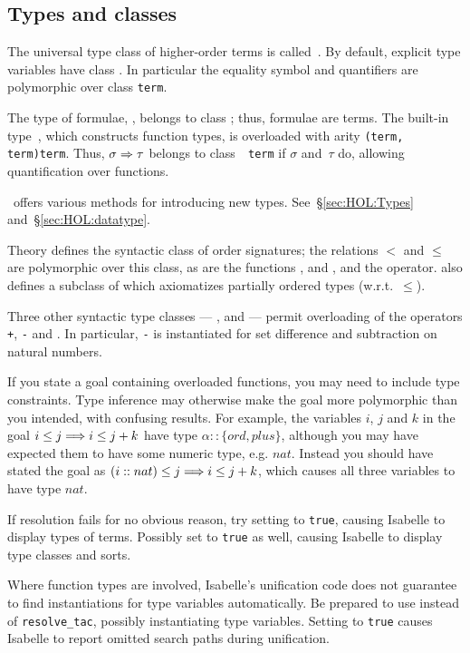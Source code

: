 \subsection{Types and classes}
The universal type class of higher-order terms is called~.
By default, explicit type variables have class .  In
particular the equality symbol and quantifiers are polymorphic over
class \texttt{term}.

The type of formulae, , belongs to class ; thus,
formulae are terms.  The built-in type~, which constructs
function types, is overloaded with arity {\tt(term,\thinspace
  term)\thinspace term}.  Thus, $\sigma\Rightarrow\tau$ belongs to class~{\tt
  term} if $\sigma$ and~$\tau$ do, allowing quantification over
functions.

\HOL\ offers various methods for introducing new types.
See~\S\ref{sec:HOL:Types} and~\S\ref{sec:HOL:datatype}.

Theory  defines the syntactic class  of order
signatures; the relations $<$ and $\leq$ are polymorphic over this
class, as are the functions ,  and , and
the  operator.  also defines a subclass
 of  which axiomatizes partially ordered types
(w.r.t.\ $\le$).

Three other syntactic type classes --- ,  and
 --- permit overloading of the operators {\tt+}, {\tt-} and {\tt*}. In
particular, {\tt-} is instantiated for set difference and subtraction
on natural numbers.

If you state a goal containing overloaded functions, you may need to include
type constraints.  Type inference may otherwise make the goal more
polymorphic than you intended, with confusing results.  For example, the
variables $i$, $j$ and $k$ in the goal $i \le j \Longrightarrow i \le j+k$ have type
$\alpha::\{ord,plus\}$, although you may have expected them to have some
numeric type, e.g. $nat$.  Instead you should have stated the goal as
$(i::nat) \le j \Longrightarrow i \le j+k$, which causes all three variables to have
type $nat$.

\begin{warn}
  If resolution fails for no obvious reason, try setting
   to \texttt{true}, causing Isabelle to display
  types of terms.  Possibly set  to \texttt{true} as
  well, causing Isabelle to display type classes and sorts.

  Where function types are involved, Isabelle's unification code does not
  guarantee to find instantiations for type variables automatically.  Be
  prepared to use  instead of \texttt{resolve_tac},
  possibly instantiating type variables.  Setting
   to \texttt{true} causes Isabelle to report
  omitted search paths during unification.
\end{warn}


